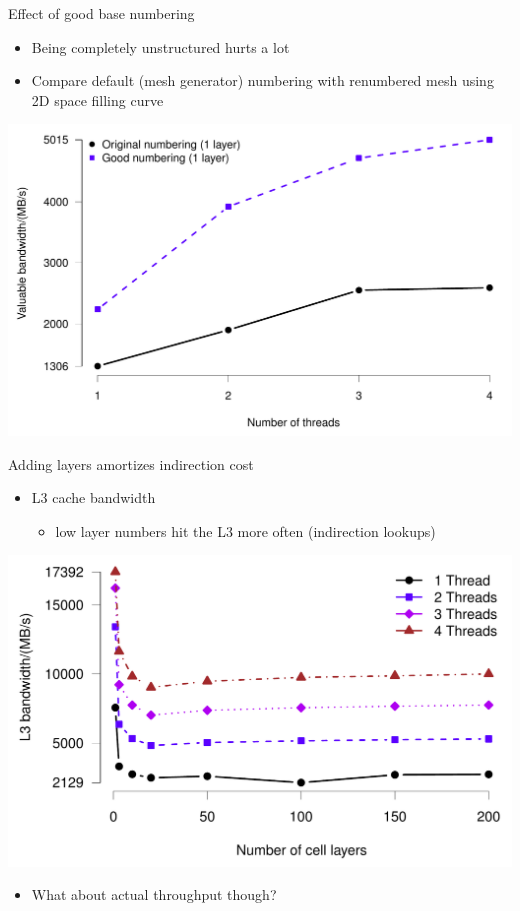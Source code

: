 \documentclass[bigger]{beamer}
\begin{document}
\begin{frame}[label={sec:orgheadline19}]{Effect of good base numbering}
\begin{itemize}
\item Being completely unstructured hurts a lot
\item Compare default (mesh generator) numbering with renumbered mesh
using 2D space filling curve
\end{itemize}
\begin{center}
\includegraphics[height=0.8\textheight]{02-22-SIAM-PP-extruded-meshes.figures/bad-numbering}
\end{center}
\end{frame}

\begin{frame}[label={sec:orgheadline20}]{Adding layers amortizes indirection cost}
\begin{itemize}
\item L3 cache bandwidth
\begin{itemize}
\item low layer numbers hit the L3 more often (indirection lookups)
\end{itemize}
\end{itemize}
\begin{center}
\includegraphics[height=0.6\textheight]{02-22-SIAM-PP-extruded-meshes.figures/L3-bandwidth}
\end{center}
\begin{itemize}
\item What about actual throughput though?
\end{itemize}
\end{frame}
\end{document}
